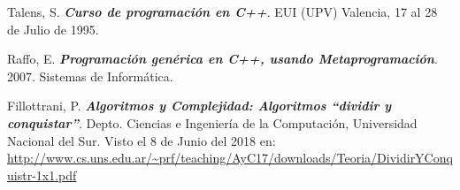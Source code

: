 \begin{thebibliography}{IEEE}
 Talens, S. \textbf{\textit{Curso de programación en C++}}. EUI (UPV) Valencia, 17 al 28 de Julio de 1995. 

 Raffo, E. \textbf{\textit{Programación genérica en C++, usando Metaprogramación}}. 2007. Sistemas de Informática. 

 Fillottrani, P. \textbf{\textit{Algoritmos y Complejidad:
Algoritmos “dividir y conquistar”}}. Depto. Ciencias e Ingeniería de la Computación, Universidad Nacional del Sur. Visto el 8 de Junio del 2018 en: \url{http://www.cs.uns.edu.ar/~prf/teaching/AyC17/downloads/Teoria/DividirYConquistr-1x1.pdf} 
\end{thebibliography}

